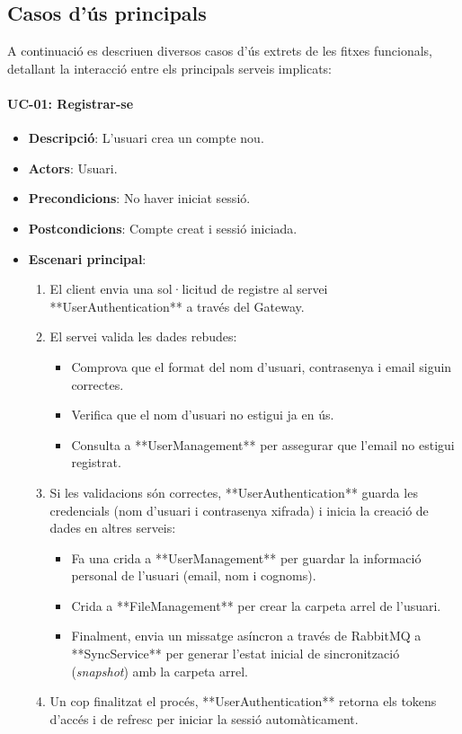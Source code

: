 \subsection{Casos d'\'us principals}
A continuació es descriuen diversos casos d'\'us extrets de les fitxes funcionals, detallant la interacció entre els principals serveis implicats:

\paragraph{UC-01: Registrar-se}
\begin{itemize}
  \item \textbf{Descripció}: L'usuari crea un compte nou.
  \item \textbf{Actors}: Usuari.
  \item \textbf{Precondicions}: No haver iniciat sessió.
  \item \textbf{Postcondicions}: Compte creat i sessió iniciada.
  \item \textbf{Escenari principal}:
    \begin{enumerate}
        \item El client envia una sol·licitud de registre al servei **UserAuthentication** a través del Gateway.
        \item El servei valida les dades rebudes:
            \begin{itemize}
                \item Comprova que el format del nom d'usuari, contrasenya i email siguin correctes.
                \item Verifica que el nom d'usuari no estigui ja en ús.
                \item Consulta a **UserManagement** per assegurar que l'email no estigui registrat.
            \end{itemize}
        \item Si les validacions són correctes, **UserAuthentication** guarda les credencials (nom d'usuari i contrasenya xifrada) i inicia la creació de dades en altres serveis:
            \begin{itemize}
                \item Fa una crida a **UserManagement** per guardar la informació personal de l'usuari (email, nom i cognoms).
                \item Crida a **FileManagement** per crear la carpeta arrel de l'usuari.
                \item Finalment, envia un missatge asíncron a través de RabbitMQ a **SyncService** per generar l'estat inicial de sincronització (\emph{snapshot}) amb la carpeta arrel.
            \end{itemize}
        \item Un cop finalitzat el procés, **UserAuthentication** retorna els tokens d'accés i de refresc per iniciar la sessió automàticament.
    \end{enumerate}
\end{itemize}

